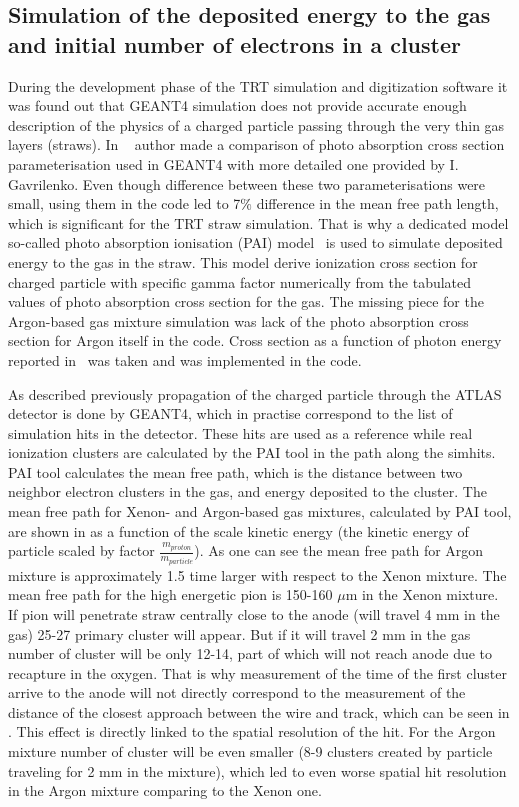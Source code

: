 \subsection{Simulation of the deposited energy to the gas and initial number of electrons in a cluster}
\label{subsec:pai_model}
During the development phase of the TRT simulation and digitization software it was found out that GEANT4 simulation does not provide accurate enough description of the physics
of a charged particle passing through the very thin gas layers (straws). 
In ~\cite{kittelmann_thesis} author made a comparison of photo absorption cross section parameterisation used in GEANT4 with more detailed one provided by I. Gavrilenko.
Even though difference between these two parameterisations were small, using them in the code led to 7$\%$ difference in the mean free path length, which is significant for the TRT straw simulation.
That is why a dedicated model so-called photo absorption ionisation (PAI) model~\cite{pai_model_paper} is used to simulate deposited energy to the gas in the straw.
This model derive ionization cross section for charged particle with specific gamma factor numerically from the tabulated values of photo absorption cross section for the gas.
The missing piece for the Argon-based gas mixture simulation was lack of the photo absorption cross section for Argon itself in the code.
Cross section as a function of photon energy reported in~\cite{argon_cross_section} was taken and was implemented in the code.

As described previously propagation of the charged particle through the ATLAS detector is done by GEANT4, which in practise correspond to the list of simulation hits in the detector.
These hits are used as a reference while real ionization clusters are calculated by the PAI tool in the path along the simhits.
PAI tool calculates the mean free path, which is the distance between two neighbor electron clusters in the gas, and energy deposited to the cluster. 
The mean free path for Xenon- and Argon-based gas mixtures, calculated by PAI tool, are shown in  as a function of the scale kinetic energy 
(the kinetic energy of particle scaled by factor $\frac{m_{proton}}{m_{particle}}$). As one can see the mean free path for Argon mixture is approximately 1.5 time larger with respect to the Xenon mixture.
The mean free path for the high energetic pion is 150-160 $\mu$m in the Xenon mixture. If pion will penetrate straw centrally close to the anode (will travel 4 mm in the gas) 25-27 primary cluster will appear.
But if it will travel 2 mm in the gas number of cluster will be only 12-14, part of which will not reach anode due to recapture in the oxygen. 
That is why measurement of the time of the first cluster arrive to the anode will not directly correspond to the measurement of the distance of the closest approach between the wire and track, 
which can be seen in . This effect is directly linked to the spatial resolution of the hit.
For the Argon mixture number of cluster will be even smaller (8-9 clusters created by particle traveling for 2 mm in the mixture), which led to even worse spatial hit resolution in the Argon mixture comparing 
to the Xenon one.

